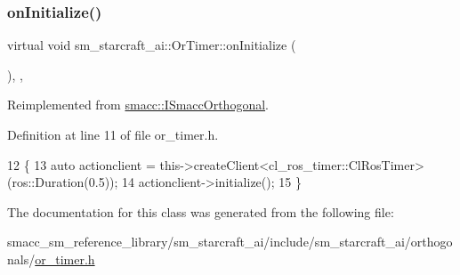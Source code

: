 \subsubsection{\texorpdfstring{on\+Initialize()}{onInitialize()}}
{\footnotesize\ttfamily virtual void sm\+\_\+starcraft\+\_\+ai\+::\+Or\+Timer\+::on\+Initialize (\begin{DoxyParamCaption}{ }\end{DoxyParamCaption})\hspace{0.3cm}{\ttfamily [inline]}, {\ttfamily [override]}, {\ttfamily [virtual]}}



Reimplemented from \hyperlink{classsmacc_1_1ISmaccOrthogonal_a6bb31c620cb64dd7b8417f8705c79c7a}{smacc\+::\+I\+Smacc\+Orthogonal}.



Definition at line 11 of file or\+\_\+timer.\+h.


\begin{DoxyCode}
12     \{
13         \textcolor{keyword}{auto} actionclient = this->createClient<cl\_ros\_timer::ClRosTimer>(ros::Duration(0.5));
14         actionclient->initialize();
15     \}
\end{DoxyCode}


The documentation for this class was generated from the following file\+:\begin{DoxyCompactItemize}
\item 
smacc\+\_\+sm\+\_\+reference\+\_\+library/sm\+\_\+starcraft\+\_\+ai/include/sm\+\_\+starcraft\+\_\+ai/orthogonals/\hyperlink{sm__starcraft__ai_2include_2sm__starcraft__ai_2orthogonals_2or__timer_8h}{or\+\_\+timer.\+h}\end{DoxyCompactItemize}
